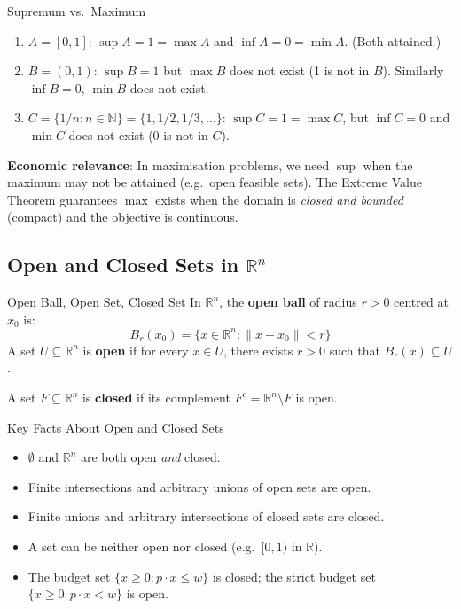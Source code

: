 \documentclass[12pt, a4paper]{article}
\theoremstyle{definition}
\newcommand{\R}{\mathbb{R}}
\newcommand{\N}{\mathbb{N}}
\begin{document}
\begin{exbox}{Supremum vs.\ Maximum}
\begin{enumerate}
  \item $A = [0,1]$: $\sup A = 1 = \max A$ and $\inf A = 0 = \min A$. (Both attained.)
  \item $B = (0,1)$: $\sup B = 1$ but $\max B$ does not exist (1 is not in $B$). Similarly $\inf B = 0$, $\min B$ does not exist.
  \item $C = \{1/n : n \in \N\} = \{1, 1/2, 1/3, \ldots\}$: $\sup C = 1 = \max C$, but $\inf C = 0$ and $\min C$ does not exist (0 is not in $C$).
\end{enumerate}

\textbf{Economic relevance}: In maximisation problems, we need $\sup$ when the maximum may not be attained (e.g.\ open feasible sets). The Extreme Value Theorem guarantees $\max$ exists when the domain is \textit{closed and bounded} (compact) and the objective is continuous.
\end{exbox}

\subsection{Open and Closed Sets in $\R^n$}

\begin{defbox}{Open Ball, Open Set, Closed Set}
In $\R^n$, the \textbf{open ball} of radius $r > 0$ centred at $x_0$ is:
\[
  B_r(x_0) = \{x \in \R^n : \|x - x_0\| < r\}
\]
A set $U \subseteq \R^n$ is \textbf{open} if for every $x \in U$, there exists $r > 0$ such that $B_r(x) \subseteq U$.

A set $F \subseteq \R^n$ is \textbf{closed} if its complement $F^c = \R^n \setminus F$ is open.
\end{defbox}

\begin{keybox}{Key Facts About Open and Closed Sets}
\begin{itemize}
  \item $\emptyset$ and $\R^n$ are both open \emph{and} closed.
  \item Finite intersections and arbitrary unions of open sets are open.
  \item Finite unions and arbitrary intersections of closed sets are closed.
  \item A set can be neither open nor closed (e.g.\ $[0,1)$ in $\R$).
  \item The budget set $\{x \geq 0 : p\cdot x \leq w\}$ is closed; the strict budget set $\{x \geq 0: p\cdot x < w\}$ is open.
\end{itemize}
\end{keybox}
\end{document}
